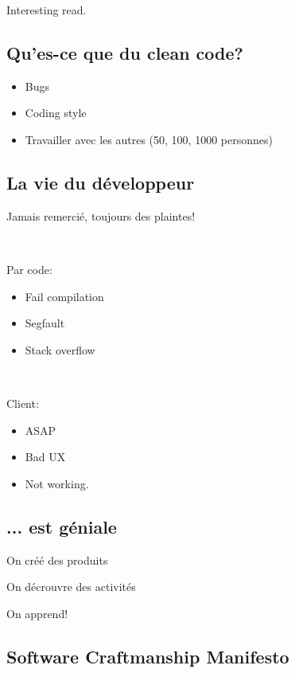 \documentclass[a4paper,11pt]{article}
\begin{document}
Interesting read.

\subsection{Qu'es-ce que du clean code?}

\begin{itemize}
\item Bugs
\item Coding style
\item Travailler avec les autres (50, 100, 1000 personnes)
\end{itemize}

\subsection{La vie du développeur}

Jamais remercié, toujours des plaintes!

\

Par code:

\begin{itemize}

\item Fail compilation

\item Segfault

\item Stack overflow

\end{itemize}

\

Client:

\begin{itemize}

\item ASAP

\item Bad UX

\item Not working.

\end{itemize}

\subsection{... est géniale}

On créé des produits

On décrouvre des activités

On apprend!

\subsection{Software Craftmanship Manifesto}
\end{document}
